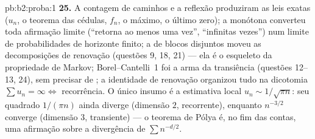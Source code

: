 \begin{solution}{pb:b2:proba:1}
\textbf{25.} A contagem de caminhos e a reflexão produziram as leis
exatas ($u_n$, o teorema das cédulas, $f_n$, o máximo, o último
zero); a  monótona converteu toda afirmação
limite (``retorna ao menos uma vez'', ``infinitas vezes'')
num limite de probabilidades de horizonte finito; a
 de blocos disjuntos moveu as decomposições
de renovação (questões 9, 18, 21) --- ela é o esqueleto
 da propriedade de Markov; Borel--Cantelli~1 foi a
arma da transiência (questões 12--13, 24), sem precisar de
; a identidade de renovação organizou tudo na
dicotomia $\sum u_n = \infty \iff$ recorrência. O único
insumo  é a estimativa local $u_n \sim 1/\sqrt{\pi
n}$: seu quadrado $1/(\pi n)$ ainda diverge (dimensão $2$,
recorrente), enquanto $n^{-3/2}$ converge (dimensão $3$,
transiente) --- o teorema de Pólya é, no fim das contas, uma afirmação
sobre a divergência de $\sum n^{-d/2}$.
\end{solution}
